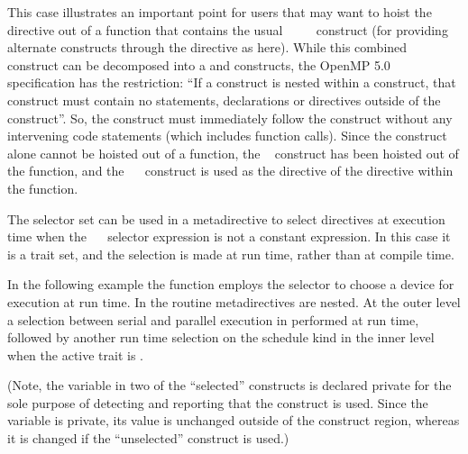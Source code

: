 This case illustrates an important point for users that may want to hoist the 
 directive out of a function that contains the usual 
~~~~ construct
(for providing alternate constructs through the  directive as here).
While this combined construct can be decomposed into a  and
 constructs, the OpenMP 5.0 specification has the restriction:
``If a  construct is nested within a  construct, that  construct must
contain no statements, declarations or directives outside of the  construct''.
So, the  construct must immediately follow the  construct without any intervening
code statements (which includes function calls).  
Since the  construct alone cannot be hoisted out of a function, 
the ~ construct has been hoisted out of the function, and the 
~~ construct is used
as the  directive of the  directive within the function.



The  selector set can be used in a metadirective
to select directives at execution time when the 
~~\code{)} selector expression is not a constant expression.
In this case it is a  trait set, and the selection is made at run time, rather
than at compile time.

In the following example the  function employs the 
selector to choose a device for execution at run time. 
In the  routine metadirectives are nested.
At the outer level a selection between serial and parallel execution in performed
at run time, followed by another run time selection on the schedule kind in the inner
level when the active  trait is . 

(Note, the variable  in two of the ``selected'' constructs is declared private for the sole purpose 
of detecting and reporting that the construct is used. Since the variable is private, its value 
is unchanged outside of the construct region, whereas it is changed if the ``unselected'' construct
is used.)

